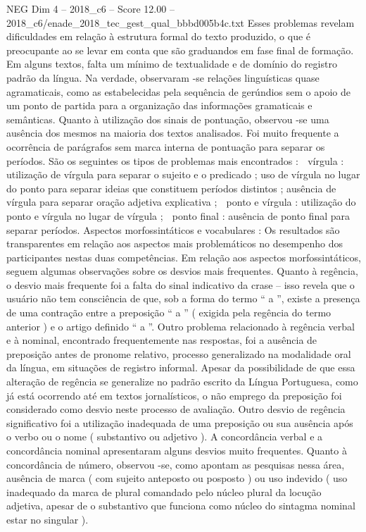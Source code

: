 \begin{textsample}{NEG Dim 4 – 2018\_c6 – Score 12.00 – 2018\_c6/enade\_2018\_tec\_gest\_qual\_bbbd005b4c.txt}
Esses problemas revelam dificuldades em relação à estrutura formal do texto produzido, o que é preocupante ao se levar em conta que são graduandos em fase final de formação.
Em alguns textos, falta um mínimo de textualidade e de domínio do registro padrão da língua.
Na verdade, observaram -se relações linguísticas quase agramaticais, como as estabelecidas pela sequência de gerúndios sem o apoio de um ponto de partida para a organização das informações gramaticais e semânticas.
Quanto à utilização dos sinais de pontuação, observou -se uma ausência dos mesmos na maioria dos textos analisados.
Foi muito frequente a ocorrência de parágrafos sem marca interna de pontuação para separar os períodos.
São os seguintes os tipos de problemas mais encontrados :  vírgula : utilização de vírgula para separar o sujeito e o predicado ; uso de vírgula no lugar do ponto para separar ideias que constituem períodos distintos ; ausência de vírgula para separar oração adjetiva explicativa ;  ponto e vírgula : utilização do ponto e vírgula no lugar de vírgula ;  ponto final : ausência de ponto final para separar períodos.
Aspectos morfossintáticos e vocabulares : Os resultados são transparentes em relação aos aspectos mais problemáticos no desempenho dos participantes nestas duas competências.
Em relação aos aspectos morfossintáticos, seguem algumas observações sobre os desvios mais frequentes.
Quanto à regência, o desvio mais frequente foi a falta do sinal indicativo da crase – isso revela que o usuário não tem consciência de que, sob a forma do termo “ a ”, existe a presença de uma contração entre a preposição “ a ” ( exigida pela regência do termo anterior ) e o artigo definido “ a ”.
Outro problema relacionado à regência verbal e à nominal, encontrado frequentemente nas respostas, foi a ausência de preposição antes de pronome relativo, processo generalizado na modalidade oral da língua, em situações de registro informal.
Apesar da possibilidade de que essa alteração de regência se generalize no padrão escrito da Língua Portuguesa, como já está ocorrendo até em textos jornalísticos, o não emprego da preposição foi considerado como desvio neste processo de avaliação.
Outro desvio de regência significativo foi a utilização inadequada de uma preposição ou sua ausência após o verbo ou o nome ( substantivo ou adjetivo ).
A concordância verbal e a concordância nominal apresentaram alguns desvios muito frequentes.
Quanto à concordância de número, observou -se, como apontam as pesquisas nessa área, ausência de marca ( com sujeito anteposto ou posposto ) ou uso indevido ( uso inadequado da marca de plural comandado pelo núcleo plural da locução adjetiva, apesar de o substantivo que funciona como núcleo do sintagma nominal estar no singular ).

\end{textsample}
